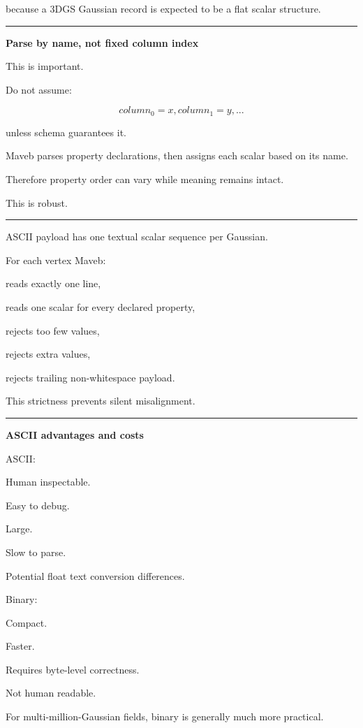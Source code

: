 because a 3DGS Gaussian record is expected to be a flat scalar structure.

\begin{center}\rule{0.5\linewidth}{0.5pt}\end{center}

\textbf{Parse by name, not fixed column index}

This is important.

Do not assume:

\[
column_0=x,
column_1=y,...
\]

unless schema guarantees it.

Maveb parses property declarations, then assigns each scalar based on its name.

Therefore property order can vary while meaning remains intact.

This is robust.

\begin{center}\rule{0.5\linewidth}{0.5pt}\end{center}

ASCII payload has one textual scalar sequence per Gaussian.

For each vertex Maveb:

reads exactly one line,

reads one scalar for every declared property,

rejects too few values,

rejects extra values,

rejects trailing non-whitespace payload.

This strictness prevents silent misalignment.

\begin{center}\rule{0.5\linewidth}{0.5pt}\end{center}

\textbf{ASCII advantages and costs}

ASCII:

Human inspectable.

Easy to debug.

Large.

Slow to parse.

Potential float text conversion differences.

Binary:

Compact.

Faster.

Requires byte-level correctness.

Not human readable.

For multi-million-Gaussian fields, binary is generally much more practical.

